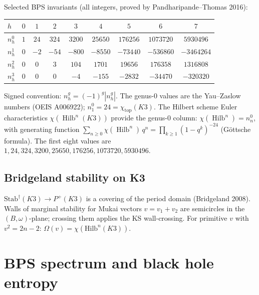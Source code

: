 \begin{proposition}
\label{prop:bps-k3}
Selected BPS invariants \textup{(}all integers, proved by
Pandharipande--Thomas 2016\textup{)}:
\begin{center}
\small
\renewcommand{\arraystretch}{1.2}
\begin{tabular}{lcccccccc}
$h$ & $0$ & $1$ & $2$ & $3$ & $4$ & $5$ & $6$ & $7$ \\
\hline
$n^0_h$ & $1$ & $24$ & $324$ & $3200$ & $25650$ & $176256$
 & $1073720$ & $5930496$ \\
$n^1_h$ & $0$ & $-2$ & $-54$ & $-800$ & $-8550$ & $-73440$
 & $-536860$ & $-3464264$ \\
$n^2_h$ & $0$ & $0$ & $3$ & $104$ & $1701$ & $19656$
 & $176358$ & $1316808$ \\
$n^3_h$ & $0$ & $0$ & $0$ & $-4$ & $-155$ & $-2832$
 & $-34470$ & $-320320$
\end{tabular}
\end{center}
Signed convention: $n^g_h = (-1)^g |n^g_h|$. The genus-$0$
values are the Yau--Zaslow numbers \textup{(}OEIS A006922\textup{)};
$n^0_1 = 24 = \chi_{\mathrm{top}}(K3)$.
The Hilbert scheme Euler characteristics
$\chi(\operatorname{Hilb}^n(K3))$ provide the
genus-$0$ column: $\chi(\operatorname{Hilb}^n) = n^0_n$,
with generating function
$\sum_{n \geq 0} \chi(\operatorname{Hilb}^n)\,q^n =
\prod_{k \geq 1}(1-q^k)^{-24}$
\textup{(}G\"ottsche formula\textup{)}. The first eight values
are $1, 24, 324, 3200, 25650, 176256, 1073720, 5930496$.
\end{proposition}

\subsection{Bridgeland stability on K3}
\label{subsec:bridgeland-k3}

\begin{remark}
\label{rem:bridgeland-k3}
$\mathrm{Stab}^\dagger(K3) \to P^+(K3)$ is a covering of the
period domain (Bridgeland 2008). Walls of marginal stability for
Mukai vectors $v = v_1 + v_2$ are semicircles in the
$(B,\omega)$-plane; crossing them applies the KS wall-crossing.
For primitive $v$ with $v^2 = 2n - 2$:
$\Omega(v) = \chi(\mathrm{Hilb}^n(K3))$.
\end{remark}



\section{BPS spectrum and black hole entropy}
\label{sec:bps-bh-k3xe}

